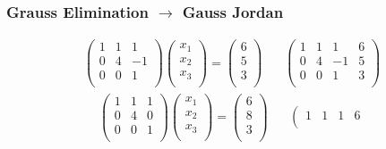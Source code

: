 \documentclass[10pt]{beamer}
\begin{document}
\begin{frame}
  \frametitle{Grauss Elimination $\rightarrow$ Gauss Jordan}
  \[
    \begin{array}{cc}
    \left(
      \begin{array}{rrr}
        1 &  1 &  1\\
        0 &  4 & -1\\
        0 &  0 &  1\\
      \end{array}
    \right)
    \left(
      \begin{array}{r}
        x_1 \\ x_2 \\ x_ 3 \\
      \end{array}
    \right) =
    \left(
      \begin{array}{r}
        6 \\ 5 \\ 3 \\
      \end{array}
    \right)
      & ~~~~ 
    \left(
      \begin{array}{rrr|r}
        1 &  1 &  1 & 6\\
        0 &  4 & -1 & 5\\
        0 &  0 &  1 & 3\\
      \end{array}
    \right)
    \end{array}
  \] \pause
  \[
    \begin{array}{cc}
    \left(
      \begin{array}{rrr}
        1 &  1 &  1\\
        0 &  4 &  0\\
        0 &  0 &  1\\
      \end{array}
    \right)
    \left(
      \begin{array}{r}
        x_1 \\ x_2 \\ x_ 3 \\
      \end{array}
    \right) =
    \left(
      \begin{array}{r}
        6 \\ 8 \\ 3 \\
      \end{array}
    \right)
      & ~~~~
    \left(
      \begin{array}{rrr|r}
        1 &  1 &  1 & 6\\

\end{array}
\end{array}\]
\end{frame}
\end{document}
